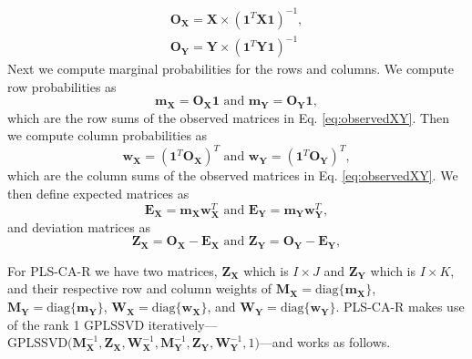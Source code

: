 \documentclass[12pt]{article}
\begin{document}
\begin{equation}
\begin{aligned}
{\mathbf O}_{\mathbf X} = {\mathbf X} \times ({\mathbf 1}^{T}{\mathbf X} {\mathbf 1})^{-1}, \\
{\mathbf O}_{\mathbf Y} = {\mathbf Y} \times ({\mathbf 1}^{T}{\mathbf Y} {\mathbf 1})^{-1}
\label{eq:observedXY}
\end{aligned}
\end{equation} Next we compute marginal probabilities for the rows and
columns. We compute row probabilities as \begin{equation}
{\mathbf m}_{\mathbf X} = {\mathbf O}_{\mathbf X}{\mathbf 1} \text{ and } {\mathbf m}_{\mathbf Y} = {\mathbf O}_{\mathbf Y}{\mathbf 1},
\label{eq:xy_rowvecs}
\end{equation} which are the row sums of the observed matrices in Eq.
\ref{eq:observedXY}. Then we compute column probabilities as
\begin{equation}
{\mathbf w}_{\mathbf X} = ({\mathbf 1}^{T}{\mathbf O}_{\mathbf X})^{T} \text{ and } {\mathbf w}_{\mathbf Y} = ({\mathbf 1}^{T}{\mathbf O}_{\mathbf Y})^{T},
\label{eq:weightmats_v1}
\end{equation} which are the column sums of the observed matrices in Eq.
\ref{eq:observedXY}. We then define expected matrices as
\begin{equation}
{\mathbf E}_{\mathbf X} = {\mathbf m}_{\mathbf X}{\mathbf w}_{\mathbf X}^{T} \text{ and } {\mathbf E}_{\mathbf Y} = {\mathbf m}_{\mathbf Y}{\mathbf w}_{\mathbf Y}^{T},
\label{eq:models}
\end{equation} and deviation matrices as \begin{equation}
{\mathbf Z}_{\mathbf X} = {\mathbf O}_{\mathbf X} - {\mathbf E}_{\mathbf X} \text{ and } {\mathbf Z}_{\mathbf Y} = {\mathbf O}_{\mathbf Y} - {\mathbf E}_{\mathbf Y},
\label{eq:plscar_Zs}
\end{equation}

For PLS-CA-R we have two matrices, \({\mathbf Z}_{\mathbf X}\) which is
\(I \times J\) and \({\mathbf Z}_{\mathbf Y}\) which is \(I \times K\),
and their respective row and column weights of
\({\mathbf M}_{\mathbf X} = \mathrm{diag\{}{\mathbf m}_{\mathbf X} \mathrm{\}}\),
\({\mathbf M}_{\mathbf Y} = \mathrm{diag\{}{\mathbf m}_{\mathbf Y} \mathrm{\}}\),
\({\mathbf W}_{\mathbf X} = \mathrm{diag\{}{\mathbf w}_{\mathbf X} \mathrm{\}}\),
and
\({\mathbf W}_{\mathbf Y} = \mathrm{diag\{}{\mathbf w}_{\mathbf Y} \mathrm{\}}\).
PLS-CA-R makes use of the rank 1 GPLSSVD
iteratively---\(\mathrm{GPLSSVD(} {\mathbf M}_{\mathbf X}^{-1}, {\mathbf Z}_{\mathbf X}, {\mathbf W}_{\mathbf X}^{-1}, {\mathbf M}_{\mathbf Y}^{-1}, {\mathbf Z}_{\mathbf Y}, {\mathbf W}_{\mathbf Y}^{-1}, 1 \mathrm{)}\)---and
works as follows.
\end{document}
